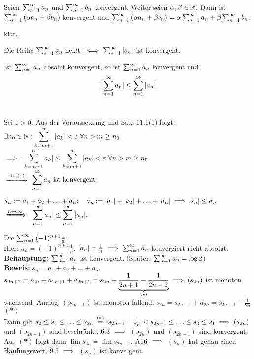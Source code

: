 \documentclass[a4paper,oneside,DIV15,BCOR12mm]{scrbook}
\begin{document}
\begin{satz}
Seien $\sum_{n=1}^{\infty}{a_n}$ und $\sum_{n=1}^{\infty}{b_n}$ konvergent. Weiter seien $\alpha,\beta \in \mathbb{R}$. Dann ist $\sum_{n=1}^{\infty}{(\alpha a_n+\beta b_n)}$ konvergent und $\sum_{n=1}^{\infty}{(\alpha a_n+\beta b_n)} = \alpha\sum_{n=1}^{\infty}{a_n}+\beta\sum_{n=1}^{\infty}{b_n}$.
\end{satz}

\begin{beweis}
klar.
\end{beweis}

\begin{definition}
Die Reihe $\sum_{n=1}^{\infty}{a_n}$ heißt  $:\iff \sum_{n=1}^{\infty}{|a_n|}$ ist konvergent. 
\end{definition}

\begin{satz}
Ist $\sum_{n=1}^{\infty}{a_n}$ absolut konvergent, so ist $\sum_{n=1}^{\infty}{a_n}$ konvergent und
$$|\sum_{n=1}^{\infty}{a_n}| \le \sum_{n=1}^{\infty}{|a_n|}$$
\ 
\end{satz}

\begin{beweis}
Sei $\varepsilon > 0$. Aus der Voraussetzung und Satz 11.1(1) folgt:\\
$\displaystyle{\exists n_0\in\ensuremath{\mathbb{N}}: \sum_{k=m+1}^{n}{|a_k|} < \varepsilon\ \forall n>m \ge n_0}$\\
$\displaystyle{\ensuremath{\implies}|\sum_{k=m+1}^{n}{a_k}| \le \sum_{k=m+1}^{n}{|a_k|} < \varepsilon\ \forall n>m \ge n_0}$\\
$\displaystyle{\folgtnach{11.1(1)} \areihe \text{ ist konvergent.}}$

$\displaystyle{s_n := a_1+a_2+\ldots+a_n;\quad\sigma_n := |a_1|+|a_2|+\ldots+|a_n| \ensuremath{\implies}|s_n|\le\sigma_n}$\\
$\displaystyle{\folgtwegen{n\to\infty} |\areihe| \le \reihe{|a_n|}}.$
\end{beweis}

\begin{beispiel}
Die  $\sum_{n=1}^{\infty}{(-1)^{n+1} \frac{1}n}$.\\
Hier: $a_n = (-1)^{n+1}\frac{1}{n}$. $|a_n| = \frac{1}{n} \implies \sum_{n=1}^{\infty}{a_n}$ konvergiert nicht absolut.\\
\textbf{Behauptung:} $\sum_{n=1}^{\infty}{a_n}$ ist konvergent. (Später: $\sum_{n=1}^{\infty}{a_n} = \log 2$)\\
\textbf{Beweis:} $s_n = a_1 + a_2 + \ldots + a_n$. \\
$s_{2n+2} = s_{2n} + a_{2n+1} + a_{2n+2} = s_{2n} + \underbrace{\frac{1}{2n+1} - \frac{1}{2n+2}}_{>0} \implies (s_{2n})$ ist monoton wachsend. Analog: $(s_{2n-1})$ ist monoton fallend. 
$s_{2n} = s_{2n-1} + a_{2n} = s_{2n-1} - \frac{1}{2n}$ $(*)$\\
Dann gilt $s_2 \le s_4 \le \ldots \le s_{2n} \gleichwegen{(*)} s_{2n-1} - \frac{1}{2n} < s_{2n-1} \le \ldots \le s_3 \le s_1 \folgt (s_{2n})$ und $(s_{2n-1})$ sind beschränkt. 6.3 $\implies$ $(s_{2n})$ und $(s_{2n-1})$ sind konvergent. Aus $(*)$ folgt dann $\lim s_{2n} = \lim s_{2n-1}$. A16 $\implies$ $(s_n)$ hat genau einen Häufungswert. 9.3 $\implies$ $(s_n)$ ist konvergent.
\end{beispiel}
\end{document}
